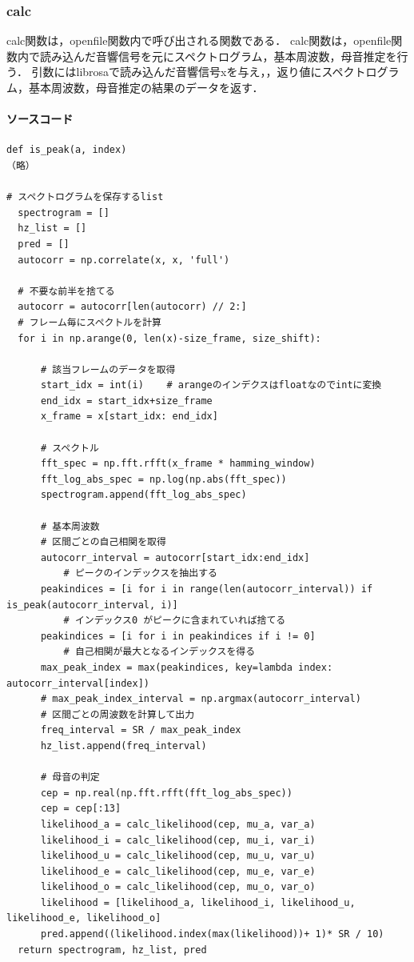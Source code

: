\documentclass[11pt,a4j]{jarticle}%
\begin{document}
\subsubsection{calc}
calc関数は，openfile関数内で呼び出される関数である．
calc関数は，openfile関数内で読み込んだ音響信号を元にスペクトログラム，基本周波数，母音推定を行う．
引数にはlibrosaで読み込んだ音響信号xを与え，，返り値にスペクトログラム，基本周波数，母音推定の結果のデータを返す．
\paragraph*{ソースコード}
\begin{lstlisting}[caption=calc関数,label=openfile]
def is_peak(a, index)
（略）

# スペクトログラムを保存するlist
  spectrogram = []
  hz_list = []
  pred = []
  autocorr = np.correlate(x, x, 'full')

  # 不要な前半を捨てる
  autocorr = autocorr[len(autocorr) // 2:] 
  # フレーム毎にスペクトルを計算
  for i in np.arange(0, len(x)-size_frame, size_shift):
      
      # 該当フレームのデータを取得
      start_idx = int(i)    # arangeのインデクスはfloatなのでintに変換
      end_idx = start_idx+size_frame
      x_frame = x[start_idx: end_idx]

      # スペクトル
      fft_spec = np.fft.rfft(x_frame * hamming_window)
      fft_log_abs_spec = np.log(np.abs(fft_spec))
      spectrogram.append(fft_log_abs_spec)
      
      # 基本周波数
      # 区間ごとの自己相関を取得
      autocorr_interval = autocorr[start_idx:end_idx]
          # ピークのインデックスを抽出する
      peakindices = [i for i in range(len(autocorr_interval)) if is_peak(autocorr_interval, i)]
          # インデックス0 がピークに含まれていれば捨てる
      peakindices = [i for i in peakindices if i != 0]
          # 自己相関が最大となるインデックスを得る
      max_peak_index = max(peakindices, key=lambda index: autocorr_interval[index])
      # max_peak_index_interval = np.argmax(autocorr_interval)
      # 区間ごとの周波数を計算して出力
      freq_interval = SR / max_peak_index
      hz_list.append(freq_interval)
      
      # 母音の判定
      cep = np.real(np.fft.rfft(fft_log_abs_spec))
      cep = cep[:13]
      likelihood_a = calc_likelihood(cep, mu_a, var_a)
      likelihood_i = calc_likelihood(cep, mu_i, var_i)
      likelihood_u = calc_likelihood(cep, mu_u, var_u)
      likelihood_e = calc_likelihood(cep, mu_e, var_e)
      likelihood_o = calc_likelihood(cep, mu_o, var_o)
      likelihood = [likelihood_a, likelihood_i, likelihood_u, likelihood_e, likelihood_o]
      pred.append((likelihood.index(max(likelihood))+ 1)* SR / 10)
  return spectrogram, hz_list, pred
\end{lstlisting}
\end{document}
